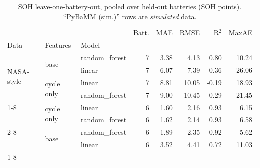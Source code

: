 \begin{table}[htbp]\centering\footnotesize
\begin{tabular}{lllrrrrr}
\toprule
 &  &  & Batt. & MAE & RMSE & R$^2$ & MaxAE \\
Data & Features & Model &  &  &  &  &  \\
\midrule
\multirow[t]{4}{*}{NASA-style} & \multirow[t]{2}{*}{base} & random\_forest & 7 & 3.38 & 4.13 & 0.80 & 10.24 \\
 &  & linear & 7 & 6.07 & 7.39 & 0.36 & 26.06 \\
\cline{2-8}
 & \multirow[t]{2}{*}{cycle only} & linear & 7 & 8.81 & 10.05 & -0.19 & 18.93 \\
 &  & random\_forest & 7 & 9.00 & 10.45 & -0.29 & 21.45 \\
\cline{1-8} \cline{2-8}
\multirow[t]{4}{*}{PyBaMM (sim.)} & \multirow[t]{2}{*}{cycle only} & linear & 6 & 1.60 & 2.16 & 0.93 & 6.15 \\
 &  & random\_forest & 6 & 1.62 & 2.14 & 0.93 & 6.58 \\
\cline{2-8}
 & \multirow[t]{2}{*}{base} & random\_forest & 6 & 1.89 & 2.35 & 0.92 & 5.62 \\
 &  & linear & 6 & 3.52 & 4.41 & 0.72 & 11.03 \\
\cline{1-8} \cline{2-8}
\bottomrule
\end{tabular}
\caption{SOH leave-one-battery-out, pooled over held-out batteries (SOH points). ``PyBaMM (sim.)'' rows are \emph{simulated} data.}\label{tab:tab_aging_soh}
\end{table}
